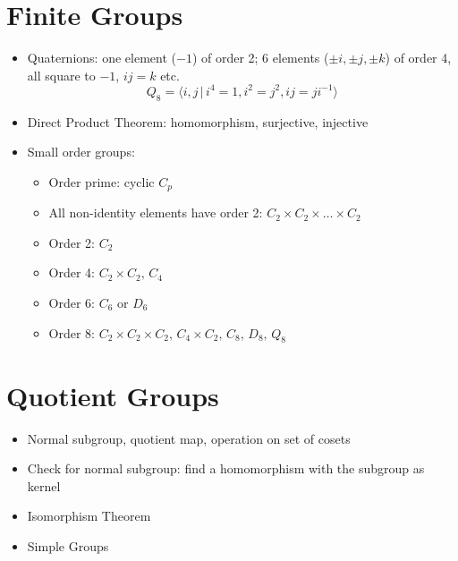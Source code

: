 \section{Finite Groups}
\begin{itemize}
      \item Quaternions: one element ($-1$) of order 2; 6 elements ($\pm i, \pm j, \pm k$) of order 4, all square to $-1$, $ij =k$ etc.
            \[Q_8 = \langle i,j \,| \, i^4=1, i^2= j^2, ij = ji^{-1}\rangle\]
      \item Direct Product Theorem: homomorphism, surjective, injective
      \item Small order groups:
            \begin{itemize}
                  \item Order prime: cyclic $C_p$
                  \item All non-identity elements have order 2: $C_2 \times C_2 \times \dots \times C_2$
                  \item Order 2: $C_2$
                  \item Order 4: $C_2 \times C_2, \, C_4$
                  \item Order 6: $C_6$ or $D_6$
                  \item Order 8: $C_2 \times C_2 \times C_2, \, C_4 \times C_2, \, C_8, \, D_8, \, Q_8$
            \end{itemize}
\end{itemize}
\section{Quotient Groups}
\begin{itemize}
      \item Normal subgroup, quotient map, operation on set of cosets
      \item Check for normal subgroup: find a homomorphism with the subgroup as kernel
      \item Isomorphism Theorem
      \item Simple Groups
\end{itemize}


